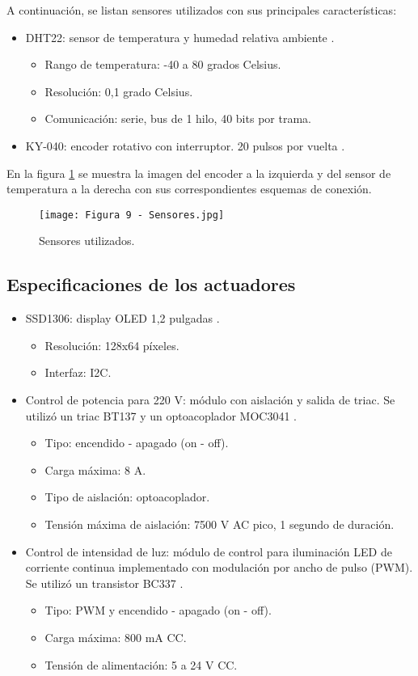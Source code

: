 A continuación, se listan sensores utilizados con sus principales características:

\begin{itemize}
	\item DHT22: sensor de temperatura y humedad relativa ambiente \citep{15}.
	\begin{itemize}
		\item Rango de temperatura: -40 a 80 grados Celsius.
		\item Resolución: 0,1 grado Celsius.
		\item Comunicación: serie, bus de 1 hilo, 40 bits por trama.
	\end{itemize}
	\item KY-040: encoder rotativo con interruptor. 20 pulsos por vuelta \citep{16}.
\end{itemize}

En la figura \ref{fig:9} se muestra la imagen del encoder a la izquierda y del sensor de temperatura a la derecha con sus correspondientes esquemas de conexión.

\newpage
\begin{figure}[h]
\centering
\texttt{[image: Figura 9 - Sensores.jpg]}
\caption[Sensores utilizados]{Sensores utilizados.}
\label{fig:9}
\end{figure}

\subsection{Especificaciones de los actuadores}

\begin{itemize}
\item SSD1306: display OLED 1,2 pulgadas \citep{17}.
	\begin{itemize}
		\item Resolución: 128x64 píxeles.
		\item Interfaz: I2C.
	\end{itemize}
	\item Control de potencia para 220 V: módulo con aislación y salida de triac. Se utilizó un triac BT137 \citep{18} y un optoacoplador MOC3041 \citep{19}.
	\begin{itemize}
		\item Tipo: encendido - apagado (on - off).
		\item Carga máxima: 8 A.
		\item Tipo de aislación: optoacoplador.
		\item Tensión máxima de aislación: 7500 V AC pico, 1 segundo de duración.
	\end{itemize}
	\item Control de intensidad de luz: módulo de control para iluminación LED de corriente continua implementado con modulación por ancho de pulso (PWM). Se utilizó un transistor BC337 \citep{20}.
	\begin{itemize}
		\item Tipo: PWM y encendido - apagado (on - off).
		\item Carga máxima: 800 mA CC.
		\item Tensión de alimentación: 5 a 24 V CC.
	\end{itemize}
\end{itemize}

